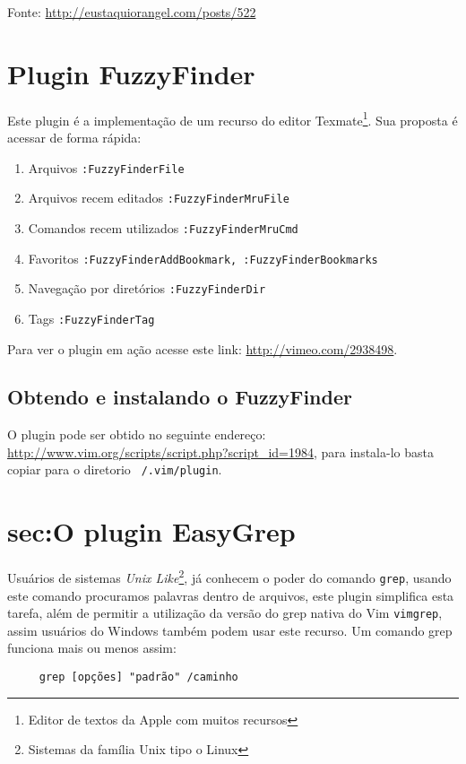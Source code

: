 Fonte: \url{http://eustaquiorangel.com/posts/522}

\section{Plugin FuzzyFinder}
\label{sec:Plugin FuzzyFinder}
                                                                       
Este plugin é a implementação de um recurso do editor 
Texmate\footnote{Editor de textos da Apple com muitos recursos}.
Sua proposta é acessar de forma rápida:


\begin{enumerate}
\item Arquivos \verb|:FuzzyFinderFile|
\item Arquivos recem editados \verb|:FuzzyFinderMruFile|
\item Comandos recem utilizados \verb|:FuzzyFinderMruCmd|
\item Favoritos \verb|:FuzzyFinderAddBookmark, :FuzzyFinderBookmarks|
\item Navegação por diretórios \verb|:FuzzyFinderDir|
\item Tags {\tt :FuzzyFinderTag}
\end{enumerate}

Para ver o plugin em ação acesse este link: 
\url{http://vimeo.com/2938498}.

\subsection{Obtendo e instalando o FuzzyFinder}
O plugin pode ser obtido no seguinte endereço: 
\url{http://www.vim.org/scripts/script.php?script_id=1984},
para instala-lo basta copiar para o diretorio 
{\tt ~/.vim/plugin}.

\section{sec:O plugin EasyGrep}
\label{sec:O plugin EasyGrep}

Usuários de sistemas {\em Unix Like}\footnote{Sistemas da família Unix tipo o Linux}, já
conhecem o poder do comando {\tt grep}, usando este comando procuramos palavras dentro 
de arquivos, este plugin simplifica esta tarefa, além de permitir a utilização
da versão do grep nativa do Vim {\tt vimgrep}, assim usuários do Windows também podem usar 
este recurso. Um comando grep funciona mais ou menos assim:

\begin{verbatim}
     grep [opções] "padrão" /caminho
\end{verbatim}

